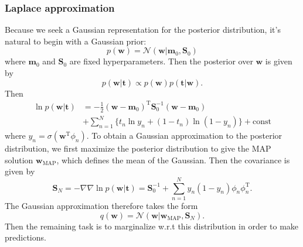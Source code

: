\documentclass[a4paper]{book}
\newcommand{\normD}{\mathcal{N}}
\newcommand{\mrm}{\mathrm}
\newcommand{\mbf}{\mathbf}
\newcommand{\ww}{\mbf w}
\newcommand{\mm}{\mbf m}
\newcommand{\ttt}{\mbf t}
\newcommand{\rev}{^{-1}}
\newcommand{\trans}{^{\mrm T}}
\begin{document}
\subsubsection*{Laplace approximation}
Because we seek a Gaussian representation for the posterior distribution, it's natural to begin with a Gaussian prior:
\begin{equation}\label{}
  p(\ww)=\normD(\ww|\mm_0,\mbf S_0)
\end{equation}
where $\mm_0$ and $\mbf S_0$ are fixed hyperparameters. Then the posterior over $\ww$ is given by
\begin{equation}\label{}
  p(\ww|\ttt)\propto p(\ww)p(\ttt|\ww).
\end{equation}
Then
\begin{align}\label{}
  \ln p(\ww|\ttt) & = -\frac12(\ww-\mm_0)\trans\mbf S_0\rev(\ww-\mm_0) \\
  & +\sum_{n=1}^{N}\{t_n\ln y_n+(1-t_n)\ln (1-y_n)\} + \mrm{const}
\end{align}
where $y_n=\sigma(\ww\trans\phi_n)$. To obtain a Gaussian approximation to the posterior distribution, we first maximize the posterior distribution to give the MAP solution $\ww_{\mrm{MAP}}$, which defines the mean of the Gaussian. Then the covariance is given by
\begin{equation}\label{}
  \mbf S_N=-\nabla\nabla\ln p(\ww|\ttt) = \mbf S_0\rev+\sum_{n=1}^{N}y_n(1-y_n)\phi_n\phi_n\trans.
\end{equation}
The Gaussian approximation therefore takes the form
\begin{equation}\label{}
  q(\ww)=\normD(\ww|\ww_{\mrm{MAP}}, \mbf S_N).
\end{equation}
Then the remaining task is to marginalize w.r.t this distribution in order to make predictions.
\end{document}
